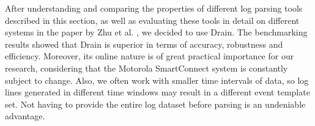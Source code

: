     After understanding and comparing the properties of different log parsing tools described in this section, as well as evaluating these tools in detail on different systems in the paper by Zhu et al. \cite{zhlhxzl2018}, we decided to use Drain. The benchmarking results showed that Drain is superior in terms of accuracy, robustness and efficiency. Moreover, its online nature is of great practical importance for our research, considering that the Motorola SmartConnect system is constantly subject to change. Also, we often work with smaller time intervals of data, so log lines generated in different time windows may result in a different event template set. Not having to provide the entire log dataset before parsing is an undeniable advantage.
